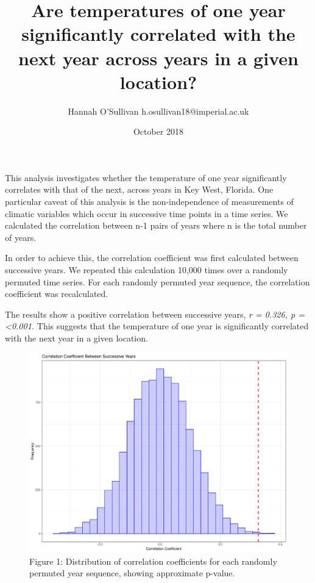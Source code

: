 \documentclass[12pt]{article}
\title{Are temperatures of one year significantly correlated with the next year across years in a given location?}
\author{Hannah O'Sullivan h.osullivan18@imperial.ac.uk}
\date{October 2018}
\begin{document}
  \maketitle
  This analysis investigates whether the temperature of one year significantly correlates with that of the next, across years in Key West, Florida. One particular caveat of this analysis is the non-independence of measurements of climatic variables which occur in successive time points in a time series. We calculated the correlation between n-1 pairs of years where n is the total number of years.

  In order to achieve this, the correlation coefficient was first calculated between successive years. We repeated this calculation 10,000 times over a randomly permuted time series. For each randomly permuted year sequence, the correlation coefficient was recalculated.

  The results show a positive correlation between successive years, \textit {r = 0.326, p = \textless 0.001.} This suggests that the temperature of one year is significantly correlated with the next year in a given location.

\begin{figure}[ft]
      \includegraphics[width = 1\textwidth]{../Data/TAutoCorrPlot.PDF}
      \caption{Figure 1: Distribution of correlation coefficients for each randomly permuted year sequence, showing approximate p-value.}
\end{figure}
\end{document}
